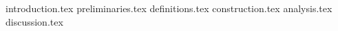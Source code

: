 {introduction.tex}
{preliminaries.tex}
{definitions.tex}
{construction.tex}
{analysis.tex}
{discussion.tex}

